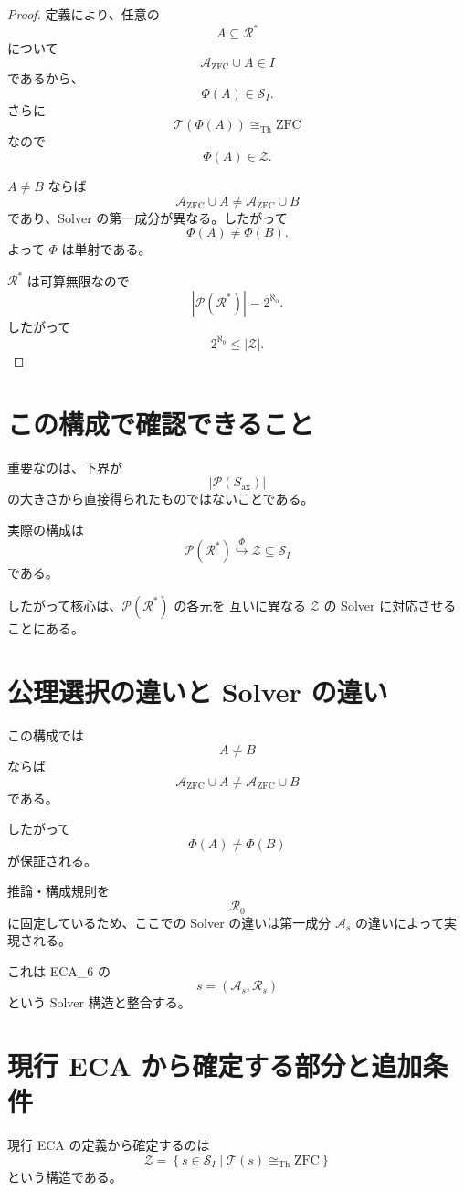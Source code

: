 \documentclass[a4paper,11pt]{article}
\newcommand{\Solver}{\mathcal{S}}
\newcommand{\Ax}{S_{\mathrm{ax}}}
\begin{document}
\begin{proof}
定義により、任意の
\[
A\subseteq\mathcal{R}^*
\]
について
\[
\mathcal{A}_{\mathrm{ZFC}}\cup A\in I
\]
であるから、
\[
\Phi(A)\in\Solver_I.
\]
さらに
\[
\mathcal{T}(\Phi(A))
\cong_{\mathrm{Th}}\mathrm{ZFC}
\]
なので
\[
\Phi(A)\in\mathcal{Z}.
\]

$A\neq B$ ならば
\[
\mathcal{A}_{\mathrm{ZFC}}\cup A
\neq
\mathcal{A}_{\mathrm{ZFC}}\cup B
\]
であり、Solver の第一成分が異なる。したがって
\[
\Phi(A)\neq\Phi(B).
\]
よって $\Phi$ は単射である。

$\mathcal{R}^*$ は可算無限なので
\[
|\mathcal{P}(\mathcal{R}^*)|=2^{\aleph_0}.
\]
したがって
\[
2^{\aleph_0}\leq|\mathcal{Z}|.
\]
\end{proof}

\section{この構成で確認できること}

重要なのは、下界が
\[
|\mathcal{P}(\Ax)|
\]
の大きさから直接得られたものではないことである。

実際の構成は
\[
\mathcal{P}(\mathcal{R}^*)
\overset{\Phi}{\hookrightarrow}
\mathcal{Z}
\subseteq\Solver_I
\]
である。

したがって核心は、$\mathcal{P}(\mathcal{R}^*)$ の各元を
互いに異なる $\mathcal{Z}$ の Solver に対応させることにある。

\section{公理選択の違いと Solver の違い}

この構成では
\[
A\neq B
\]
ならば
\[
\mathcal{A}_{\mathrm{ZFC}}\cup A
\neq
\mathcal{A}_{\mathrm{ZFC}}\cup B
\]
である。

したがって
\[
\Phi(A)\neq\Phi(B)
\]
が保証される。

推論・構成規則を
\[
\mathcal{R}_0
\]
に固定しているため、ここでの Solver の違いは第一成分
$\mathcal{A}_s$ の違いによって実現される。

これは ECA_6 の
\[
s=(\mathcal{A}_s,\mathcal{R}_s)
\]
という Solver 構造と整合する。

\section{現行 ECA から確定する部分と追加条件}

現行 ECA の定義から確定するのは
\[
\mathcal{Z}=
\left\{
s\in\Solver_I\mid
\mathcal{T}(s)\cong_{\mathrm{Th}}\mathrm{ZFC}
\right\}
\]
という構造である。
\end{document}
